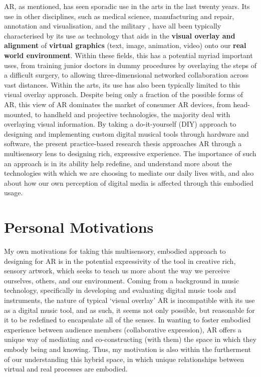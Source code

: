 AR, as mentioned, has seen sporadic use in the arts in the last twenty years. Its use in other disciplines, such as medical science, manufacturing and repair, annotation and visualisation, and the military \citep{azuma1997}, have all been typically characterised by its use as technology that aids in the \textbf{visual overlay and alignment} of \textbf{virtual graphics} (text, image, animation, video) onto our \textbf{real world environment}. Within these fields, this has a potential myriad important uses, from training junior doctors in dummy procedures by overlaying the steps of a difficult surgery, to allowing three-dimensional networked collaboration across vast distances. Within the arts, its use has also been typically limited to this visual overlay approach. Despite being only a fraction of the possible forms of AR, this view of AR dominates the market of consumer AR devices, from head-mounted, to handheld and projective technologies, the majority deal with overlaying visual information.  By taking a do-it-yourself (DIY) approach to designing and implementing custom digital musical tools through hardware and software, the present practice-based research thesis approaches AR through a multisensory lens to designing rich, expressive experience. The importance of such an approach is in its ability help redefine, and understand more about the technologies with which we are choosing to mediate our daily lives with, and also about how our own perception of digital media is affected through this embodied usage. 



\section{Personal Motivations}
My own motivations for taking this multisensory, embodied approach to designing for AR is in the potential expressivity of the tool in creative rich, sensory artwork, which seeks to teach us more about the way we perceive ourselves, others, and our environment. Coming from a background in music technology, specifically in developing and evaluating digital music tools and instruments, the nature of typical `visual overlay' AR is incompatible with its use as a digital music tool, and as such, it seems not only possible, but reasonable for it to be redefined to encapsulate all of the senses. In wanting to foster embodied experience between audience members (collaborative expression), AR offers a unique way of mediating and co-constructing (with them) the space in which they embody being and knowing. Thus, my motivation is also within the furtherment of our understanding this hybrid space, in which unique relationships between virtual and real processes are embodied.




